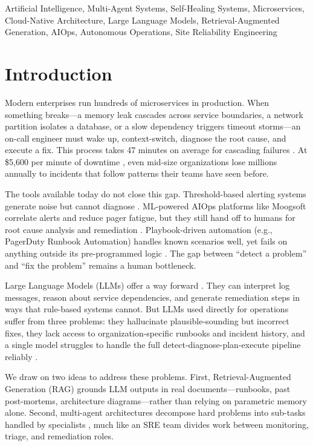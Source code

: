 \documentclass[journal]{IEEEtran}
\begin{document}
\begin{IEEEkeywords}
Artificial Intelligence, Multi-Agent Systems, Self-Healing Systems, Microservices, Cloud-Native Architecture, Large Language Models, Retrieval-Augmented Generation, AIOps, Autonomous Operations, Site Reliability Engineering
\end{IEEEkeywords}

\section{Introduction}
\label{sec:introduction}

Modern enterprises run hundreds of microservices in production. When something breaks---a memory leak cascades across service boundaries, a network partition isolates a database, or a slow dependency triggers timeout storms---an on-call engineer must wake up, context-switch, diagnose the root cause, and execute a fix. This process takes 47 minutes on average for cascading failures \cite{chen2024survey}. At \$5,600 per minute of downtime \cite{oppenheimer2003internet}, even mid-size organizations lose millions annually to incidents that follow patterns their teams have seen before.

The tools available today do not close this gap. Threshold-based alerting systems generate noise but cannot diagnose \cite{notaro2021survey}. ML-powered AIOps platforms like Moogsoft correlate alerts and reduce pager fatigue, but they still hand off to humans for root cause analysis and remediation \cite{dang2019aiops}. Playbook-driven automation (e.g., PagerDuty Runbook Automation) handles known scenarios well, yet fails on anything outside its pre-programmed logic \cite{soldani2022anomaly}. The gap between ``detect a problem'' and ``fix the problem'' remains a human bottleneck.

Large Language Models (LLMs) offer a way forward \cite{brown2020language, openai2023gpt4}. They can interpret log messages, reason about service dependencies, and generate remediation steps in ways that rule-based systems cannot. But LLMs used directly for operations suffer from three problems: they hallucinate plausible-sounding but incorrect fixes, they lack access to organization-specific runbooks and incident history, and a single model struggles to handle the full detect-diagnose-plan-execute pipeline reliably \cite{ji2023survey}.

We draw on two ideas to address these problems. First, Retrieval-Augmented Generation (RAG) grounds LLM outputs in real documents---runbooks, past post-mortems, architecture diagrams---rather than relying on parametric memory alone. Second, multi-agent architectures decompose hard problems into sub-tasks handled by specialists \cite{wu2023autogen, hong2024metagpt}, much like an SRE team divides work between monitoring, triage, and remediation roles.
\end{document}

